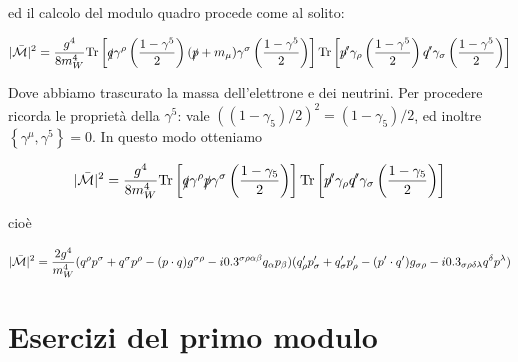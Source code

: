 \documentclass[11pt]{report}
\begin{document}
ed il calcolo del modulo quadro procede come al solito: 

\begin{align}
    |\mathcal{\bar{M}}|^2 = \frac{g^4}{8m^4_W}\text{Tr}\left[\slashed{q}\gamma^\rho \left(\frac{1-\gamma^5}{2} \right) (\slashed{p} + m_\mu)\gamma^\sigma \left(\frac{1-\gamma^5}{2} \right)\right]\text{Tr}\left[\slashed{p'}\gamma_\rho \left(\frac{1-\gamma^5}{2} \right) \slashed{q'}\gamma_\sigma \left(\frac{1-\gamma^5}{2} \right)\right] 
\end{align}

Dove abbiamo trascurato la massa dell'elettrone e dei neutrini. Per procedere ricorda le proprietà della \(\gamma^5\): vale \(((1-\gamma_5)/2)^2 = (1-\gamma_5)/2\), ed inoltre \(\left\{\gamma^\mu, \gamma^5\right\} = 0\). In questo modo otteniamo 

\begin{align}
    |\mathcal{\bar{M}}|^2 = \frac{g^4}{8m_W^4}\text{Tr}\left[\slashed{q}\gamma^\rho \slashed{p}\gamma^\sigma \left(\frac{1-\gamma_5}{2}\right) \right]\text{Tr}\left[\slashed{p'}\gamma_\rho \slashed{q'}\gamma_\sigma \left(\frac{1-\gamma_5}{2}\right) \right]
\end{align}

cioè

\begin{align}
    |\mathcal{\bar{M}}|^2 = \frac{2g^4}{m^4_W}(q^\rho p^\sigma + q^\sigma p^\rho - (p\cdot q)g^{\sigma\rho} -i0.3^{\sigma\rho\alpha\beta}q_\alpha p_\beta)(q'_\rho p'_\sigma + q'_\sigma p'_\rho - (p'\cdot q')g_{\sigma\rho} -i0.3_{\sigma\rho\delta\lambda}q^\delta p^\lambda)
\end{align}






































\chapter{Esercizi del primo modulo}
\end{document}
